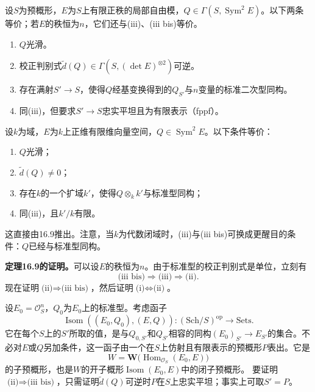 \begingroup
\def\newscope{V-Q}
\def\OO{\mathcal O}
\def\Qsp{\mathcal Q}
\def\Sym{\operatorname{Sym}}
\def\Isom{\operatorname{Isom}}
\def\Hom{\operatorname{Hom}}
设$S$为预概形，$E$为$S$上有限正秩的局部自由模，$Q\in\Gamma(S,\Sym^2 E)$。以下两条等价；若$E$的秩恒为$n$，它们还与(iii)、(iii bis)等价。
\begin{enumerate}
\renewcommand{\labelenumi}{(\roman{enumi})}
\item $Q$光滑。
\item 校正判别式$\widetilde d(Q)\in\Gamma(S,(\det E)^{\otimes2})$可逆。
\item 存在满射$S'\to S$，使得$Q$经基变换得到的$Q_{S'}$与$n$变量的标准二次型同构。
\item[(iii bis)] 同(iii)，但要求$S'\to S$忠实平坦且为有限表示（fppf）。
\end{enumerate}

设$k$为域，$E$为$k$上正维有限维向量空间，$Q\in\Sym^2 E$。以下条件等价：
\begin{enumerate}
\renewcommand{\labelenumi}{(\roman{enumi})}
\item $Q$光滑；
\item $\widetilde d(Q)\ne0$；
\item 存在$k$的一个扩域$k'$，使得$Q\otimes_k k'$与标准型同构；
\item[(iii bis)] 同(iii)，且$k'/k$有限。
\end{enumerate}
这直接由16.9推出。注意，当$k$为代数闭域时，(iii)与(iii bis)可换成更醒目的条件：$Q$已经与标准型同构。

\noindent\textbf{定理16.9的证明。}\quad 可以设$E$的秩恒为$n$。由于标准型的校正判别式是单位，立刻有
\[
  \text{(iii bis)}\Longrightarrow\text{(iii)}\Longrightarrow\text{(ii)} .
\]
现在证明$\text{(ii)}\Rightarrow\text{(iii bis)}$，然后证明$\text{(i)}\Leftrightarrow\text{(ii)}$。

设$E_0=\OO_S^n$，$Q_0$为$E_0$上的标准型。考虑函子
\[
 \Isom((E_0,Q_0),(E,Q)):(\mathrm{Sch}/S)^{\mathrm{op}}\longrightarrow\mathrm{Sets}.
\]
它在每个$S$上的$S'$所取的值，是与$Q_{0,S'}$和$Q_{S'}$相容的同构$(E_0)_{S'}\to E_{S'}$的集合。不必对$E$或$Q$另加条件，这一函子由一个在$S$上仿射且有限表示的预概形$P$表出。它是
\[
 W=\mathbf W\bigl(\Hom_{\OO_S}(E_0,E)\bigr)
\]
的子预概形，也是$W$的开子概形$\Isom(E_0,E)$中的闭子预概形。 要证明$\text{(ii)}\Rightarrow\text{(iii bis)}$，只需证明$\widetilde d(Q)$可逆时$P$在$S$上忠实平坦；事实上可取$S'=P$。

